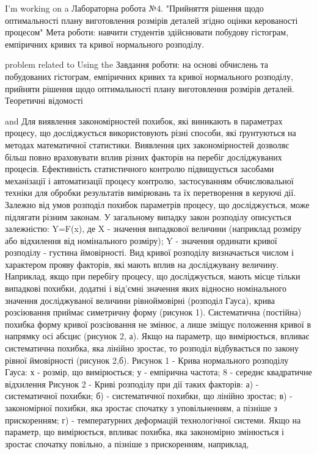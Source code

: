 I'm working on a Лабораторна робота №4. "Прийняття рішення щодо оптимальності
плану виготовлення розмірів деталей згідно оцінки керованості процесом"
Мета роботи: навчити студентів здійснювати побудову гістограм,
емпіричних кривих та кривої нормального розподілу.

problem related to Using the
Завдання роботи: на основі обчислень та побудованих гістограм,
емпіричних кривих та кривої нормального розподілу, прийняти рішення щодо
оптимальності плану виготовлення розмірів деталей.
Теоретичні відомості

and
Для виявлення закономірностей похибок, які виникають в параметрах
процесу, що досліджується використовують різні способи, які ґрунтуються на
методах математичної статистики. Виявлення цих закономірностей дозволяє
більш повно враховувати вплив різних факторів на перебіг досліджуваних
процесів.
Ефективність статистичного контролю підвищується засобами
механізації і автоматизації процесу контролю, застосуванням обчислювальної
техніки для обробки результатів вимірювань та їх перетворення в керуючі дії.
Залежно від умов розподіл похибок параметрів процесу, що
досліджується, може підлягати різним законам. У загальному випадку закон
розподілу описується залежністю:
Y=F(x),
де X - значення випадкової величини (наприклад розміру або відхилення
від номінального розміру);
Y - значення ординати кривої розподілу - густина ймовірності.
Вид кривої розподілу визначається числом і характером прояву факторів,
які мають вплив на досліджувану величину.
Наприклад, якщо при перебігу процесу, що досліджується, мають місце
тільки випадкові похибки, додатні і від'ємні значення яких відносно
номінального значення досліджуваної величини рівноймовірні (розподіл
Гауса), крива розсіювання приймає симетричну форму (рисунок 1).
Систематична (постійна) похибка форму кривої розсіювання не змінює, а
лише зміщує положення кривої в напрямку осі абсцис (рисунок 2, а).
Якщо на параметр, що вимірюється, впливає систематична похибка, яка
лінійно зростає, то розподіл відбувається по закону рівної ймовірності (рисунок
2,б).
Рисунок 1 - Крива нормального розподілу Гауса:
х - розмір, що вимірюється; у - емпірична частота; 8 - середнє
квадратичне відхилення
Рисунок 2 - Криві розподілу при дії таких факторів:
а) - систематичної похибки; б) - систематичної похибки, що лінійно
зростає; в) - закономірної похибки, яка зростає спочатку з уповільненням, а
пізніше з прискоренням; г) - температурних деформацій технологічної системи.
Якщо на параметр, що вимірюється, впливає похибка, яка закономірно
змінюється і зростає спочатку повільно, а пізніше з прискоренням, наприклад,
